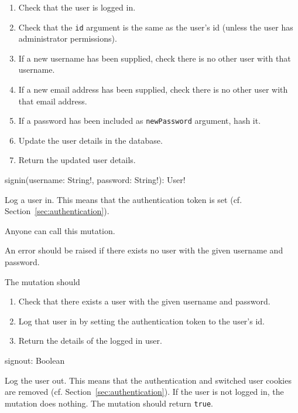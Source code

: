 \begin{enumerate}
    \item Check that the user is logged in.
    \item Check that the \verb|id| argument is the same as the user's id (unless the user has administrator permissions).
    \item If a new username has been supplied, check there is no other user with that username.
    \item If a new email address has been supplied, check there is no other user with that email address.
    \item If a password has been included as \verb|newPassword| argument, hash it.
    \item Update the user details in the database.
    \item Return the updated user details.
\end{enumerate}


\begin{code}
signin(username: String!, password: String!): User!
\end{code}

Log a user in. This means that the authentication token is set (cf. Section~\ref{sec:authentication}).

\restrictions

Anyone can call this mutation.

\errors

An error should be raised if there exists no user with the given username and password.

\functionality

The mutation should

\begin{enumerate}
    \item Check that there exists a user with the given username and password.
    \item Log that user in by setting the authentication token to the user's id.
    \item Return the details of the logged in user.
\end{enumerate}


\begin{code}
signout: Boolean
\end{code}

Log the user out. This means that the authentication and switched user cookies are removed (cf. Section~\ref{sec:authentication}). If the user is not logged in, the mutation does nothing. The mutation should return \verb|true|.


